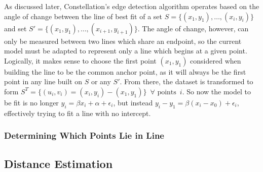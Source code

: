 As discussed later, Constellation's edge detection algorithm operates based on the angle of change between the line of best fit of a set $S=\{(x_1,y_1),\dots,(x_i,y_i)\}$ and set $S'=\{(x_1,y_1),\dots,(x_{i+1},y_{i+1})\}$. The angle of change, however, can only be measured between two lines which share an endpoint, so the current model must be adapted to represent only a line which begins at a given point. Logically, it makes sense to choose the first point $(x_1,y_1)$ considered when building the line to be the common anchor point, as it will always be the first point in any line built on $S$ or any $S'$. From there, the dataset is transformed to form $S^T=\{(u_i,v_i)=(x_i,y_i)-(x_1,y_1)\} \enspace \forall \text{ points}\enspace i$. So now the model to be fit is no longer $y_i=\beta x_i + \alpha + \epsilon_i$, but instead $y_i-y_1=\beta(x_i-x_0)+\epsilon_i$, effectively trying to fit a line with no intercept.
\subsubsection{Determining Which Points Lie in Line}
\subsection{Distance Estimation}
